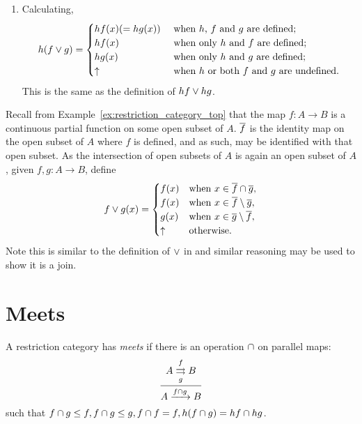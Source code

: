 \begin{example}
\begin{enumerate}[{(}i{)}]
    \item Calculating,
      \[
         h(f\vee g) = \begin{cases}
           hf(x)( = hg(x))& \text{ when $h$, $f$ and $g$ are defined;}\\
           hf(x)& \text{ when only $h$ and $f$ are defined;}\\
           hg(x)& \text{ when only $h$ and $g$ are defined;}\\
           \uparrow & \text{ when $h$ or both $f$ and $g$ are undefined.}
         \end{cases}
       \]
       This is the same as the definition of $h f \vee h g$.
  \end{enumerate}

\end{example}
\begin{example}\label{ex:joins_in_top}
   Recall from Example~\ref{ex:restriction_category_top} that the map $f:A\to B$ is a continuous
   partial function on some open subset of $A$. $\overline{f}$ is the identity map on the open subset of
   $A$ where $f$ is defined, and as such, may be identified with that open subset.
   As the intersection of open subsets of $A$ is again
   an open subset of $A$, given $f,g:A\to B$, define
   \[
      f\vee g(x) = \begin{cases}
        f(x) &\text{when }x\in  \overline{f}\cap\overline{g},\\
        f(x) &\text{when }x\in  \overline{f}\setminus\overline{g},\\
        g(x) &\text{when }x\in  \overline{g}\setminus\overline{f},\\
        \uparrow &\text{otherwise.}
      \end{cases}
   \]
   Note this is similar to the definition of $\vee$ in \Par and similar reasoning may be used to
   show it is a join.
\end{example}



\section{Meets} %
\label{sub:meets_in_restriction_categories}

\begin{definition}\label{def:meet_in_a_restriction_category}
  A restriction category has \emph{meets} if there is an operation $\cap$ on parallel maps:
  \[
    \infer{A\xrightarrow{f\meet g} B}
      {A\overset{f}{\underset{g}{\rightrightarrows}}B}
  \]
  such that $f\cap g \le f, f\cap g \le g, f\cap f = f, h (f\cap g) = h f \cap h g$.
\end{definition}

